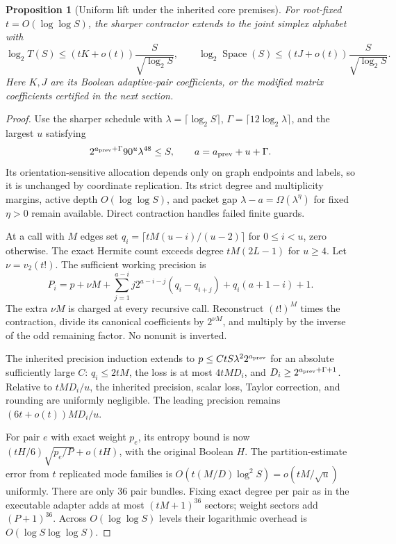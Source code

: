 \documentclass[11pt]{article}
\newtheorem{proposition}{Proposition}
\begin{document}
\begin{proposition}[Uniform lift under the inherited core premises]
For root-fixed $t=O(\log\log S)$, the sharper contractor extends to
the joint simplex alphabet with
\[
 \log_2 T(S)\le(tK+o(t))\frac S{\sqrt{\log_2S}},\qquad
 \log_2\operatorname{Space}(S)\le(tJ+o(t))\frac S{\sqrt{\log_2S}}.
\]
Here $K,J$ are its Boolean adaptive-pair coefficients, or the
modified matrix coefficients certified in the next section.
\end{proposition}
\begin{proof}
Use the sharper schedule with $\lambda=\lceil\log_2S\rceil$,
$\Gamma=\lceil12\log_2\lambda\rceil$, and the largest $u$ satisfying
\[
 2^{a_{\rm prev}+\Gamma}90^u\lambda^{48}\le S,
 \qquad a=a_{\rm prev}+u+\Gamma.
\]
Its orientation-sensitive allocation depends only on graph endpoints
and labels, so it is unchanged by coordinate replication. Its strict
degree and multiplicity margins, active depth $O(\log\log S)$,
and packet gap $\lambda-a=\Omega(\lambda^\eta)$ for fixed $\eta>0$
remain available. Direct contraction handles failed finite guards.

At a call with $M$ edges set
$q_i=\lceil tM(u-i)/(u-2)\rceil$ for $0\le i<u$, zero otherwise.
The exact Hermite count exceeds degree $tM(2L-1)$ for $u\ge4$.
Let $\nu=v_2(t!)$. The sufficient working precision is
\[
 P_i=p+\nu M+\sum_{j=1}^{a-i}j2^{a-i-j}(q_i-q_{i+j})
           +q_i(a+1-i)+1.
\]
The extra $\nu M$ is charged at every recursive call. Reconstruct
$(t!)^M$ times the contraction, divide its canonical coefficients
by $2^{\nu M}$, and multiply by the inverse of the odd remaining
factor. No nonunit is inverted.

The inherited precision induction extends to
$p\le C tS\lambda^2 2^{a_{\rm prev}}$ for an absolute sufficiently
large $C$: $q_i\le2tM$, the loss is at most $4tMD_i$, and
$D_i\ge2^{a_{\rm prev}+\Gamma+1}$. Relative to $tMD_i/u$,
the inherited precision, scalar loss, Taylor correction, and rounding
are uniformly negligible. The leading precision remains
$(6t+o(t))MD_i/u$.

For pair $e$ with exact weight $p_e$, its entropy bound is now
$(tH/6)\sqrt{p_e/P}+o(tH)$, with the original Boolean $H$.
The partition-estimate error from $t$ replicated mode families is
$O(t(M/D)\log^2S)=o(tM/\sqrt u)$ uniformly. There are only 36
pair bundles. Fixing exact degree per pair as in the executable
adapter adds at most $(tM+1)^{36}$ sectors; weight sectors add
$(P+1)^{36}$. Across $O(\log\log S)$ levels their logarithmic
overhead is $O(\log S\log\log S)$.


\end{proof}
\end{document}
